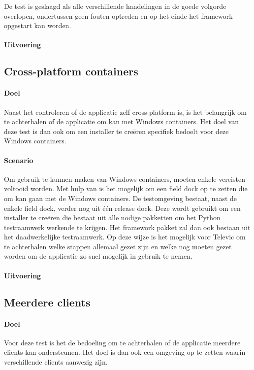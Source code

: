 De test is geslaagd als alle verschillende handelingen in de goede volgorde overlopen, ondertussen geen fouten optreden en op het einde het framework opgestart kan worden.

\paragraph{Uitvoering}


\subsection{Cross-platform containers}
\paragraph{Doel}
Naast het controleren of de applicatie zelf cross-platform is, is het belangrijk om te achterhalen of de applicatie om kan met Windows containers.
Het doel van deze test is dan ook om een installer te creëren specifiek bedoelt voor deze Windows containers.

\paragraph{Scenario}
Om gebruik te kunnen maken van Windows containers, moeten enkele vereisten voltooid worden.
Met hulp van \citet{windowsContainers} is het mogelijk om een field dock op te zetten die om kan gaan met de Windows containers.
De testomgeving bestaat, naast de enkele field dock, verder nog uit één release dock.
Deze wordt gebruikt om een installer te creëren die bestaat uit alle nodige pakketten om het Python testraamwerk werkende te krijgen.
Het framework pakket zal dan ook bestaan uit het daadwerkelijke testraamwerk.
Op deze wijze is het mogelijk voor Televic om te achterhalen welke stappen allemaal gezet zijn en welke nog moeten gezet worden om de applicatie zo snel mogelijk in gebruik te nemen.

\paragraph{Uitvoering}

\subsection{Meerdere clients}
\paragraph{Doel}
Voor deze test is het de bedoeling om te achterhalen of de applicatie meerdere clients kan ondersteunen.
Het doel is dan ook een omgeving op te zetten waarin verschillende clients aanwezig zijn.

